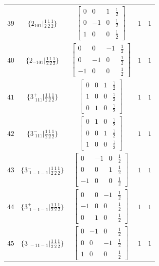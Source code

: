 \documentclass[fleqn,8pt]{jsarticle}
\begin{document}
\begin{longtable}{ccccc}
$ 39 $ & $ \{2{}_{101}|\frac{1}{2} \frac{1}{2} \frac{1}{2}\} $ & $ \begin{bmatrix} 0 & 0 & 1 & \frac{1}{2} \\ 0 & -1 & 0 & \frac{1}{2} \\ 1 & 0 & 0 & \frac{1}{2} \end{bmatrix} $ & $ 1 $ & $ 1 $ \\ \hline
$ 40 $ & $ \{2{}_{-101}|\frac{1}{2} \frac{1}{2} \frac{1}{2}\} $ & $ \begin{bmatrix} 0 & 0 & -1 & \frac{1}{2} \\ 0 & -1 & 0 & \frac{1}{2} \\ -1 & 0 & 0 & \frac{1}{2} \end{bmatrix} $ & $ 1 $ & $ 1 $ \\ \hline
$ 41 $ & $ \{3^{+}_{\,\,111}|\frac{1}{2} \frac{1}{2} \frac{1}{2}\} $ & $ \begin{bmatrix} 0 & 0 & 1 & \frac{1}{2} \\ 1 & 0 & 0 & \frac{1}{2} \\ 0 & 1 & 0 & \frac{1}{2} \end{bmatrix} $ & $ 1 $ & $ 1 $ \\ \hline
$ 42 $ & $ \{3^{-}_{\,\,111}|\frac{1}{2} \frac{1}{2} \frac{1}{2}\} $ & $ \begin{bmatrix} 0 & 1 & 0 & \frac{1}{2} \\ 0 & 0 & 1 & \frac{1}{2} \\ 1 & 0 & 0 & \frac{1}{2} \end{bmatrix} $ & $ 1 $ & $ 1 $ \\ \hline
$ 43 $ & $ \{3^{-}_{\,\,1-1-1}|\frac{1}{2} \frac{1}{2} \frac{1}{2}\} $ & $ \begin{bmatrix} 0 & -1 & 0 & \frac{1}{2} \\ 0 & 0 & 1 & \frac{1}{2} \\ -1 & 0 & 0 & \frac{1}{2} \end{bmatrix} $ & $ 1 $ & $ 1 $ \\ \hline
$ 44 $ & $ \{3^{+}_{\,\,1-1-1}|\frac{1}{2} \frac{1}{2} \frac{1}{2}\} $ & $ \begin{bmatrix} 0 & 0 & -1 & \frac{1}{2} \\ -1 & 0 & 0 & \frac{1}{2} \\ 0 & 1 & 0 & \frac{1}{2} \end{bmatrix} $ & $ 1 $ & $ 1 $ \\ \hline
$ 45 $ & $ \{3^{-}_{\,\,-11-1}|\frac{1}{2} \frac{1}{2} \frac{1}{2}\} $ & $ \begin{bmatrix} 0 & -1 & 0 & \frac{1}{2} \\ 0 & 0 & -1 & \frac{1}{2} \\ 1 & 0 & 0 & \frac{1}{2} \end{bmatrix} $ & $ 1 $ & $ 1 $ \\ \hline

\end{longtable}
\end{document}
